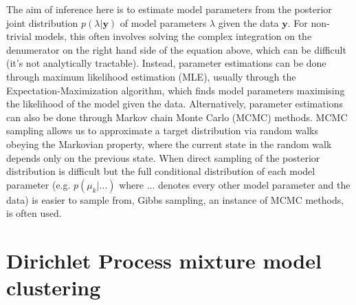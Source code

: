 The aim of inference here is to estimate model parameters from the posterior joint distribution $p(\lambda|\boldsymbol{y})$ of model parameters $\lambda$ given the data $\boldsymbol{y}$. For non-trivial models, this often involves solving the complex integration on the denumerator on the right hand side of the equation above, which can be difficult (it's not analytically tractable). Instead, parameter estimations can be done through maximum likelihood estimation (MLE), usually through the Expectation-Maximization algorithm, which finds model parameters maximising the likelihood of the model given the data. Alternatively, parameter estimations can also be done through Markov chain Monte Carlo (MCMC) methods. MCMC sampling allows us to approximate a target distribution via random walks obeying the Markovian property, where the current state in the random walk depends only on the previous state. When direct sampling of the posterior distribution is difficult but the full conditional distribution of each model parameter (e.g. $p(\mu_{k}|...)$ where ... denotes every other model parameter and the data) is easier to sample from, Gibbs sampling, an instance of MCMC methods, is often used. 

\section{Dirichlet Process mixture model clustering\label{background-dp-clustering}}

